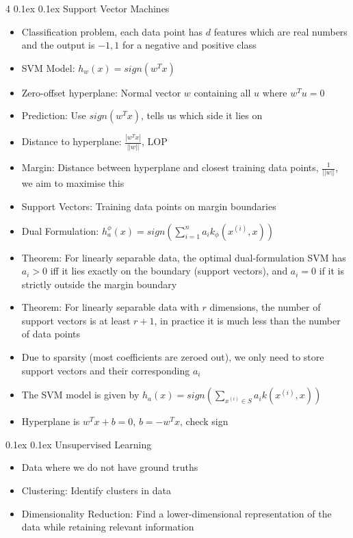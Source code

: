 \documentclass[10pt, landscape]{article}
\makeatletter
\renewcommand{\section}{\@startsection{section}{1}{0mm}%
  {0.1ex} %
  {0.1ex} %
  {\normalfont\large\bfseries}}
\makeatother
\begin{document}
\begin{multicols*}{4}
\section{Support Vector Machines}
\begin{itemize}
    \item Classification problem, each data point has $d$ features which are real numbers and the output is $-1,1$ for a negative and positive class
    \item SVM Model: $h_w(x)=sign(w^Tx)$
    \item Zero-offset hyperplane: Normal vector $w$ containing all $u$ where $w^Tu=0$
    \item Prediction: Use $sign(w^Tx)$, tells us which side it lies on
    \item Distance to hyperplane: $\frac{|w^Tx|}{||w||}$, LOP
    \item Margin: Distance between hyperplane and closest training data points, $\frac{1}{||w||}$, we aim to maximise this
    \item Support Vectors: Training data points on margin boundaries
    \item Dual Formulation: $h_a^\phi(x)=sign(\sum_{i=1}^na_i k_\phi(x^{(i)},x))$
    \item Theorem: For linearly separable data, the optimal dual-formulation SVM has $a_i>0$ iff it lies exactly on the boundary (support vectors), and $a_i = 0$ if it is strictly outside the margin boundary
    \item Theorem: For linearly separable data with $r$ dimensions, the number of support vectors is at least $r+1$, in practice it is much less than the number of data points
    \item Due to sparsity (most coefficients are zeroed out), we only need to store support vectors and their corresponding $a_i$
    \item The SVM model is given by $h_a(x)=sign(\sum_{x^{(i)} \in S} a_i k(x^{(i)},x))$
    \item Hyperplane is $w^Tx+b=0$, $b=-w^Tx$, check sign
\end{itemize}

\section{Unsupervised Learning}
\begin{itemize}
    \item Data where we do not have ground truths
    \item Clustering: Identify clusters in data
    \item Dimensionality Reduction: Find a lower-dimensional representation of the data while retaining relevant information
\end{itemize}


\end{multicols*}
\end{document}
